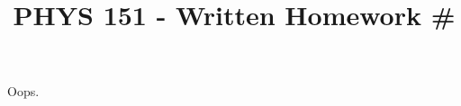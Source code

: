 \documentclass[12pt]{article}
\title{\vspace{-2\baselineskip}PHYS 151 - Written Homework \#\HOMEWORKNUM}
\author{\NAME}
\date{\DATE}
\begin{document}
\maketitle


Oops.
\end{document}
